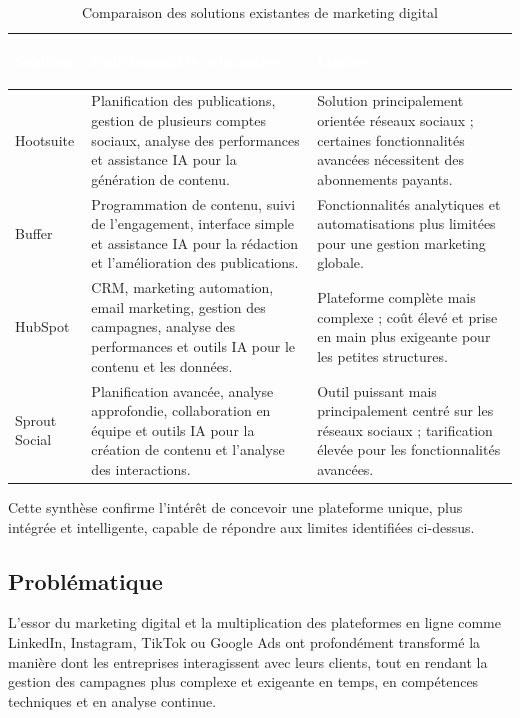 \documentclass[12pt,a4paper]{report}
\numberwithin{figure}{chapter}
\numberwithin{table}{chapter}
\begin{document}
\begin{table}[hbp]
\centering
\caption{Comparaison des solutions existantes de marketing digital}
\label{tab:solutions_existantes}
\small
\renewcommand{\arraystretch}{1.2}
\begin{tabularx}{\textwidth}{|>{\bfseries\raggedright\arraybackslash}p{2.8cm}|>{\raggedright\arraybackslash}X|>{\raggedright\arraybackslash}X|}
\hline
\rowcolor{tableheadergreen}
\textcolor{white}{Solution} & \textcolor{white}{\textbf{Fonctionnalités principales}} & \textcolor{white}{\textbf{Limites}} \\
\hline
Hootsuite & Planification des publications, gestion de plusieurs comptes sociaux, analyse des performances et assistance IA pour la génération de contenu. & Solution principalement orientée réseaux sociaux ; certaines fonctionnalités avancées nécessitent des abonnements payants. \\
\hline
Buffer & Programmation de contenu, suivi de l’engagement, interface simple et assistance IA pour la rédaction et l’amélioration des publications. & Fonctionnalités analytiques et automatisations plus limitées pour une gestion marketing globale. \\
\hline
HubSpot & CRM, marketing automation, email marketing, gestion des campagnes, analyse des performances et outils IA pour le contenu et les données. & Plateforme complète mais complexe ; coût élevé et prise en main plus exigeante pour les petites structures. \\
\hline
Sprout Social & Planification avancée, analyse approfondie, collaboration en équipe et outils IA pour la création de contenu et l’analyse des interactions. & Outil puissant mais principalement centré sur les réseaux sociaux ; tarification élevée pour les fonctionnalités avancées. \\
\hline
\end{tabularx}
\end{table}

\FloatBarrier

Cette synthèse confirme l’intérêt de concevoir une plateforme unique, plus intégrée et intelligente, capable de répondre aux limites identifiées ci-dessus.


\subsection{Problématique}

L’essor du marketing digital et la multiplication des plateformes en ligne comme LinkedIn, Instagram, TikTok ou Google Ads ont profondément transformé la manière dont les entreprises interagissent avec leurs clients, tout en rendant la gestion des campagnes plus complexe et exigeante en temps, en compétences techniques et en analyse continue.
\end{document}

